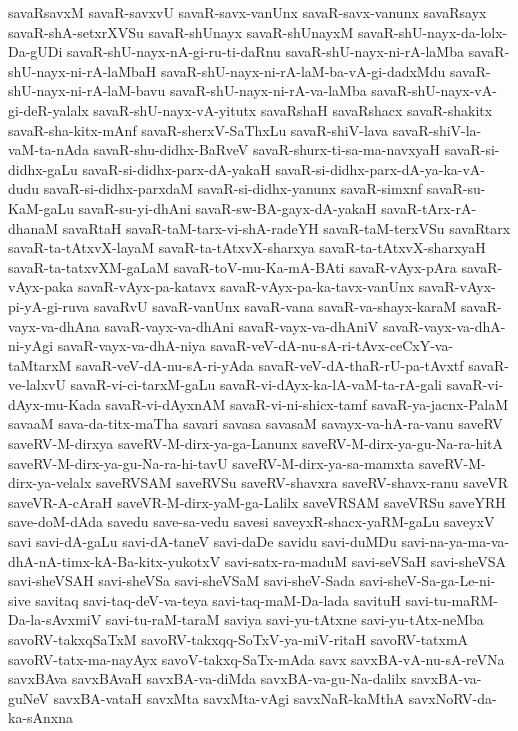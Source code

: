 {savaRsavxM
savaR-savxvU
savaR-savx-vanUnx
savaR-savx-vanunx
savaRsayx
savaR-shA-setxrXVSu
savaR-shUnayx
savaR-shUnayxM
savaR-shU-nayx-da-lolx-Da-gUDi
savaR-shU-nayx-nA-gi-ru-ti-daRnu
savaR-shU-nayx-ni-rA-laMba
savaR-shU-nayx-ni-rA-laMbaH
savaR-shU-nayx-ni-rA-laM-ba-vA-gi-dadxMdu
savaR-shU-nayx-ni-rA-laM-bavu
savaR-shU-nayx-ni-rA-va-laMba
savaR-shU-nayx-vA-gi-deR-yalalx
savaR-shU-nayx-vA-yitutx
savaRshaH
savaRshacx
savaR-shakitx
savaR-sha-kitx-mAnf
savaR-sherxV-SaThxLu
savaR-shiV-lava
savaR-shiV-la-vaM-ta-nAda
savaR-shu-didhx-BaRveV
savaR-shurx-ti-sa-ma-navxyaH
savaR-si-didhx-gaLu
savaR-si-didhx-parx-dA-yakaH
savaR-si-didhx-parx-dA-ya-ka-vA-dudu
savaR-si-didhx-parxdaM
savaR-si-didhx-yanunx
savaR-simxnf
savaR-su-KaM-gaLu
savaR-su-yi-dhAni
savaR-sw-BA-gayx-dA-yakaH
savaR-tArx-rA-dhanaM
savaRtaH
savaR-taM-tarx-vi-shA-radeYH
savaR-taM-terxVSu
savaRtarx
savaR-ta-tAtxvX-layaM
savaR-ta-tAtxvX-sharxya
savaR-ta-tAtxvX-sharxyaH
savaR-ta-tatxvXM-gaLaM
savaR-toV-mu-Ka-mA-BAti
savaR-vAyx-pAra
savaR-vAyx-paka
savaR-vAyx-pa-katavx
savaR-vAyx-pa-ka-tavx-vanUnx
savaR-vAyx-pi-yA-gi-ruva
savaRvU
savaR-vanUnx
savaR-vana
savaR-va-shayx-karaM
savaR-vayx-va-dhAna
savaR-vayx-va-dhAni
savaR-vayx-va-dhAniV
savaR-vayx-va-dhA-ni-yAgi
savaR-vayx-va-dhA-niya
savaR-veV-dA-nu-sA-ri-tAvx-ceCxY-va-taMtarxM
savaR-veV-dA-nu-sA-ri-yAda
savaR-veV-dA-thaR-rU-pa-tAvxtf
savaR-ve-lalxvU
savaR-vi-ci-tarxM-gaLu
savaR-vi-dAyx-ka-lA-vaM-ta-rA-gali
savaR-vi-dAyx-mu-Kada
savaR-vi-dAyxnAM
savaR-vi-ni-shicx-tamf
savaR-ya-jacnx-PalaM
savaaM
sava-da-titx-maTha
savari
savasa
savasaM
savayx-va-hA-ra-vanu
saveRV
saveRV-M-dirxya
saveRV-M-dirx-ya-ga-Lanunx
saveRV-M-dirx-ya-gu-Na-ra-hitA
saveRV-M-dirx-ya-gu-Na-ra-hi-tavU
saveRV-M-dirx-ya-sa-mamxta
saveRV-M-dirx-ya-velalx
saveRVSAM
saveRVSu
saveRV-shavxra
saveRV-shavx-ranu
saveVR
saveVR-A-cAraH
saveVR-M-dirx-yaM-ga-Lalilx
saveVRSAM
saveVRSu
saveYRH
save-doM-dAda
savedu
save-sa-vedu
savesi
saveyxR-shacx-yaRM-gaLu
saveyxV
savi
savi-dA-gaLu
savi-dA-taneV
savi-daDe
savidu
savi-duMDu
savi-na-ya-ma-va-dhA-nA-timx-kA-Ba-kitx-yukotxV
savi-satx-ra-maduM
savi-seVSaH
savi-sheVSA
savi-sheVSAH
savi-sheVSa
savi-sheVSaM
savi-sheV-Sada
savi-sheV-Sa-ga-Le-ni-sive
savitaq
savi-taq-deV-va-teya
savi-taq-maM-Da-lada
savituH
savi-tu-maRM-Da-la-sAvxmiV
savi-tu-raM-taraM
saviya
savi-yu-tAtxne
savi-yu-tAtx-neMba
savoRV-takxqSaTxM
savoRV-takxqq-SoTxV-ya-miV-ritaH
savoRV-tatxmA
savoRV-tatx-ma-nayAyx
savoV-takxq-SaTx-mAda
savx
savxBA-vA-nu-sA-reVNa
savxBAva
savxBAvaH
savxBA-va-diMda
savxBA-va-gu-Na-dalilx
savxBA-va-guNeV
savxBA-vataH
savxMta
savxMta-vAgi
savxNaR-kaMthA
savxNoRV-da-ka-sAnxna
}
